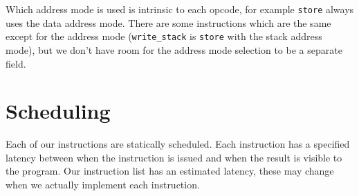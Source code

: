 \documentclass{article}
\begin{document}
	Which address mode is used is intrinsic to each opcode, for example \texttt{store} always uses the data address mode.
	There are some instructions which are the same except for the address mode (\texttt{write\_stack} is \texttt{store} with the stack address mode), but we don't have room for the address mode selection to be a separate field.

\section{Scheduling}
	Each of our instructions are statically scheduled. 
	Each instruction has a specified latency between when the instruction is issued and when the result is visible to the program.
	Our instruction list has an estimated latency, these may change when we actually implement each instruction.
\end{document}
